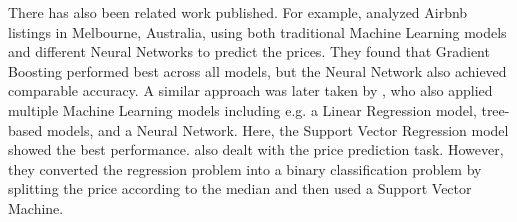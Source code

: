 There has also been related work published. For example, \citet{cai2019} analyzed Airbnb listings in Melbourne, Australia, using both traditional Machine Learning models and different Neural Networks to predict the prices. They found that Gradient Boosting performed best across all models, but the Neural Network also achieved comparable accuracy.
A similar approach was later taken by \citet{rezazadeh2021}, who also applied multiple Machine Learning models including e.g. a Linear Regression model, tree-based models, and a Neural Network. Here, the Support Vector Regression model showed the best performance.
\citet{tang2015} also dealt with the price prediction task. However, they converted the regression problem into a binary classification problem by splitting the price according to the median and then used a Support Vector Machine.
